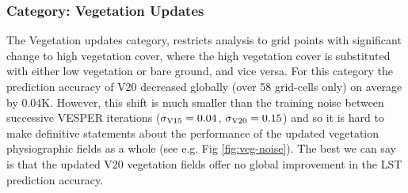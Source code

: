 \documentclass[hess, twostagejnl]{copernicus}
\begin{document}
\subsubsection{Category: Vegetation Updates}
The Vegetation updates category, restricts analysis to grid points with significant change to high vegetation cover, where  the high vegetation cover is substituted with either low vegetation or bare ground, and vice versa. For this category the prediction accuracy of V20 decreased globally (over 58 grid-cells only) on average by 0.04K. However, this shift is much smaller than the training noise between successive VESPER iterations ($\sigma_{\rm V15} = 0.04$, $\sigma_{\rm V20} = 0.15$) and so it is hard to make definitive statements about the performance of the updated vegetation physiographic fields as a whole (see e.g. Fig \ref{fig:veg-noise}). The best we can say is that the updated V20 vegetation fields offer no global improvement in the LST prediction accuracy. \newline 
\end{document}
